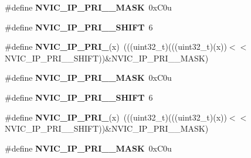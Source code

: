 \begin{DoxyCompactItemize}
\item 
\mbox{\label{group___n_v_i_c___register___masks_gad9d53a724bb3444439b236ad42d98266}} 
\#define {\bfseries N\+V\+I\+C\+\_\+\+I\+P\+\_\+\+P\+R\+I\+\_\+\_\+\+M\+A\+SK}~0x\+C0u
\item 
\mbox{\label{group___n_v_i_c___register___masks_ga06c5d2803f46b7145c7369ad34ce864b}} 
\#define {\bfseries N\+V\+I\+C\+\_\+\+I\+P\+\_\+\+P\+R\+I\+\_\+\_\+\+S\+H\+I\+FT}~6
\item 
\mbox{\label{group___n_v_i_c___register___masks_ga22846942dac231dd77494429e526f25a}} 
\#define {\bfseries N\+V\+I\+C\+\_\+\+I\+P\+\_\+\+P\+R\+I\+\_}(x)~(((uint32\+\_\+t)(((uint32\+\_\+t)(x))$<$$<$N\+V\+I\+C\+\_\+\+I\+P\+\_\+\+P\+R\+I\+\_\+\_\+\+S\+H\+I\+FT))\&N\+V\+I\+C\+\_\+\+I\+P\+\_\+\+P\+R\+I\+\_\+\_\+\+M\+A\+SK)
\item 
\mbox{\label{group___n_v_i_c___register___masks_gab2866da6e20a3704e6a7bf5c044414db}} 
\#define {\bfseries N\+V\+I\+C\+\_\+\+I\+P\+\_\+\+P\+R\+I\+\_\+\_\+\+M\+A\+SK}~0x\+C0u
\item 
\mbox{\label{group___n_v_i_c___register___masks_ga8c12a02af6fcba3c5a923613aaf0cac9}} 
\#define {\bfseries N\+V\+I\+C\+\_\+\+I\+P\+\_\+\+P\+R\+I\+\_\+\_\+\+S\+H\+I\+FT}~6
\item 
\mbox{\label{group___n_v_i_c___register___masks_ga2d18745ecc90bae0ccf2e0f284dcc75a}} 
\#define {\bfseries N\+V\+I\+C\+\_\+\+I\+P\+\_\+\+P\+R\+I\+\_}(x)~(((uint32\+\_\+t)(((uint32\+\_\+t)(x))$<$$<$N\+V\+I\+C\+\_\+\+I\+P\+\_\+\+P\+R\+I\+\_\+\_\+\+S\+H\+I\+FT))\&N\+V\+I\+C\+\_\+\+I\+P\+\_\+\+P\+R\+I\+\_\+\_\+\+M\+A\+SK)
\item 
\mbox{\label{group___n_v_i_c___register___masks_ga51ce88956f81659d9a1adb5bc13f2775}} 
\#define {\bfseries N\+V\+I\+C\+\_\+\+I\+P\+\_\+\+P\+R\+I\+\_\+\_\+\+M\+A\+SK}~0x\+C0u
\item 
\mbox{\label{group___n_v_i_c___register___masks_gac11a0fc7986b861dd44c4d4d3cdc2b50}} 

\end{DoxyCompactItemize}
